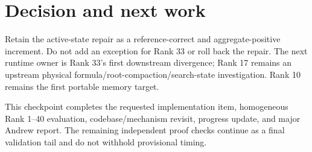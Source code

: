 \documentclass[11pt]{article}
\begin{document}
\section{Decision and next work}

Retain the active-state repair as a reference-correct and aggregate-positive
increment.  Do not add an exception for Rank 33 or roll back the repair.  The
next runtime owner is Rank 33's first downstream divergence; Rank 17 remains an
upstream physical formula/root-compaction/search-state investigation.  Rank 10
remains the first portable memory target.

This checkpoint completes the requested implementation item, homogeneous
Rank 1--40 evaluation, codebase/mechanism revisit, progress update, and major
Andrew report.  The remaining independent proof checks continue as a final
validation tail and do not withhold provisional timing.
\end{document}
